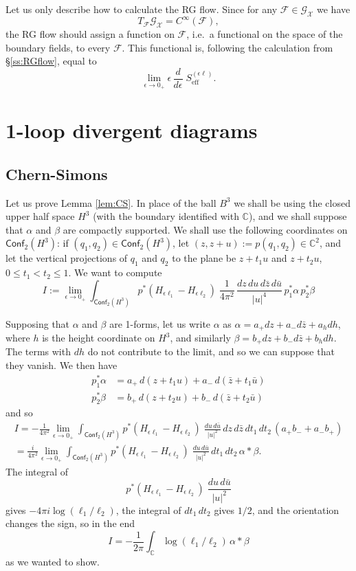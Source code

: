 \documentclass[a4paper]{amsart}
\theoremstyle{plain}
\theoremstyle{definition}
\newcommand{\mc}{\mathcal}
\newcommand{\C}{\mathbb{C}}
\newcommand{\cf}{\mathsf{Conf}}
\begin{document}
Let us only describe how to calculate the RG flow.
Since for any $\mc F\in\mc{G}_\mc X$ we have
$$T_\mc F \mc{G}_\mc X =C^\infty(\mc F), $$
the RG flow should assign a function on $\mc F$, i.e.\ a functional on the space of the boundary fields, to every $\mc F$. This functional is, following the calculation from \S\ref{ss:RGflow}, equal to
\begin{equation}\label{akszrg}
\lim_{\epsilon\to0_+} \epsilon\,\frac d{d\epsilon}\; S_\text{eff}^{(\epsilon\ell)}.
\end{equation}



\appendix

\section{1-loop divergent diagrams}
\subsection{Chern-Simons}
Let us prove Lemma \ref{lem:CS}. In place of the ball $B^3$ we shall be using the closed upper half space $H^3$ (with the boundary identified with $\C$), and we shall suppose that $\alpha$ and $\beta$ are compactly supported. We shall use the following coordinates on $\cf_2(H^3)$: if $(q_1,q_2)\in\cf_2(H^3)$, let $(z,z+u):=p(q_1,q_2)\in\C^2$, and let the vertical projections of $q_1$ and $q_2$ to the plane be $z+t_1u$ and $z+t_2u$, $0\leq t_1<t_2\leq1$. We want to compute
$$I:=
\lim_{\epsilon\to0_+}\int_{\cf_2(H^3)}p^*(H_{\epsilon\ell_1}-H_{\epsilon\ell_2})\;\frac1{4\pi^2}\,\frac{dz\,du\,d\bar z\,d\bar u}{|u|^4}\,p_1^*\alpha\, p_2^*\beta
$$

Supposing that $\alpha$ and $\beta$ are 1-forms, let us write $\alpha$ as $\alpha=a_+dz + a_-d\bar z + a_h dh$, where $h$ is the height coordinate on $H^3$, and similarly 
$\beta=b_+dz + b_-d\bar z + b_h dh$. The terms with $dh$ do not contribute to the limit, and so we can suppose that they vanish. We then have
\begin{align*}
p_1^*\alpha&=a_+\, d(z+t_1 u) + a_-\, d(\bar z + t_1\bar u)\\
p_2^*\beta&=b_+\, d(z+t_2 u) + b_-\, d(\bar z + t_2\bar u)
\end{align*}
and so
\begin{multline*}
I=-\frac1{4\pi^2}\lim_{\epsilon\to0_+}\int_{\cf_2(H^3)}p^*(H_{\epsilon\ell_1}-H_{\epsilon\ell_2})\;\frac{du\,d\bar u}{|u|^2}\,dz\,d\bar z\,dt_1\,dt_2\,(a_+b_-+a_-b_+) \\
=\frac i{4\pi^2}\lim_{\epsilon\to0_+}\int_{\cf_2(H^3)}p^*(H_{\epsilon\ell_1}-H_{\epsilon\ell_2})\;\frac{du\,d\bar u}{|u|^2}\,dt_1\,dt_2\,\alpha *\beta.
\end{multline*}
The integral of 
$$p^*(H_{\epsilon\ell_1}-H_{\epsilon\ell_2})\;\frac{du\,d\bar u}{|u|^2}$$
gives $-4\pi i\log(\ell_1/\ell_2)$, the integral of $dt_1\,dt_2$ gives $1/2$, and the orientation changes the sign, so in the end
$$I=-\frac1{2\pi}\int_\C\log(\ell_1/\ell_2)\,\alpha*\beta$$
as we wanted to show.
\end{document}
